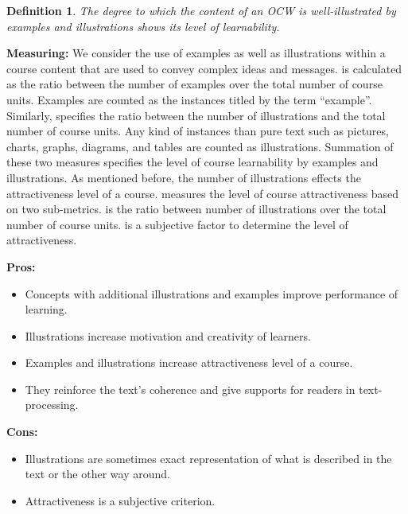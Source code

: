 \documentclass{sig-alternate}
\theoremstyle{definition}
\newtheorem{defn}{Definition}
\begin{document}
\begin{defn}
\emph {The degree to which the content of an OCW is well-illustrated by examples and illustrations shows its level of learnability.}
\end{defn}

\noindent\textbf{Measuring:}
We consider the use of examples as well as illustrations within a course content that are used to convey complex ideas and messages.
 is calculated as the ratio between the number of examples over the total number of course units.
Examples are counted as the instances titled by the term ``example''.
Similarly,  specifies the ratio between the number of illustrations and the total number of course units.
Any kind of instances than pure text such as pictures, charts, graphs, diagrams, and tables are counted as illustrations.
Summation of these two measures specifies the level of course learnability by examples and illustrations.
As mentioned before, the number of illustrations effects the attractiveness level of a course.
 measures the level of course attractiveness based on two sub-metrics.
 is the ratio between number of illustrations over the total number of course units.
 is a subjective factor to determine the level of attractiveness.  

\noindent\textbf{Pros:}
\begin{itemize}
\item Concepts with additional illustrations and examples improve performance of learning.
\item Illustrations increase motivation and creativity of learners.
\item Examples and illustrations increase attractiveness level of a course.
\item They reinforce the text’s coherence and give supports for readers in text-processing. \end{itemize}
\noindent\textbf{Cons:}
\begin{itemize}
\item Illustrations are sometimes exact representation of what is described in the text or the other way around.
\item Attractiveness is a subjective criterion.
\end{itemize}
\end{document}
